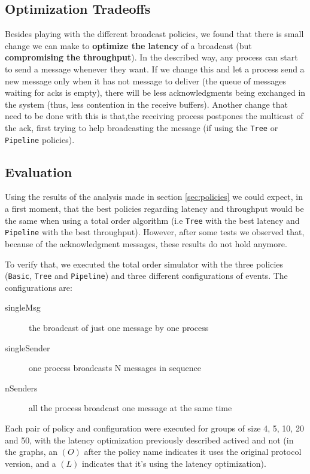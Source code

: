 \documentclass[a4paper, 11pt]{article}
\begin{document}
\subsection{Optimization Tradeoffs}
	Besides playing with the different broadcast policies, we found that there is small change we can make to \textbf{optimize the latency} of a broadcast (but \textbf{compromising the throughput}). In the described way, any process can start to send a message whenever they want. If we change this and let a process send a new message only when it has not message to deliver (the queue of messages waiting for acks is empty), there will be less acknowledgments being exchanged in the system (thus, less contention in the receive buffers). Another change that need to be done with this is that,the receiving process postpones the multicast of the ack, first trying to help broadcasting the message (if using the \texttt{Tree} or \texttt{Pipeline} policies).

\subsection{Evaluation}
	Using the results of the analysis made in section \ref{sec:policies} we could expect, in a first moment, that the best policies regarding latency and throughput would be the same when using a total order algorithm (i.e \texttt{Tree} with the best latency and \texttt{Pipeline} with the best throughput). However, after some tests we observed that, because of the acknowledgment messages, these results do not hold anymore.
	
	To verify that, we executed the total order simulator with the three policies (\texttt{Basic}, \texttt{Tree} and \texttt{Pipeline}) and three different configurations of events. The configurations are:
	
\begin{description}
	\item[singleMsg] the broadcast of just one message by one process
	\item[singleSender] one process broadcasts N messages in sequence
	\item[nSenders] all the process broadcast one message at the same time
\end{description}

Each pair of policy and configuration were executed for groups of size 4, 5, 10, 20 and 50, with the latency optimization previously  described actived and not (in the graphs, an $(O)$ after the policy name indicates it uses the original protocol version, and a $(L)$ indicates that it's using the latency optimization).
\end{document}

